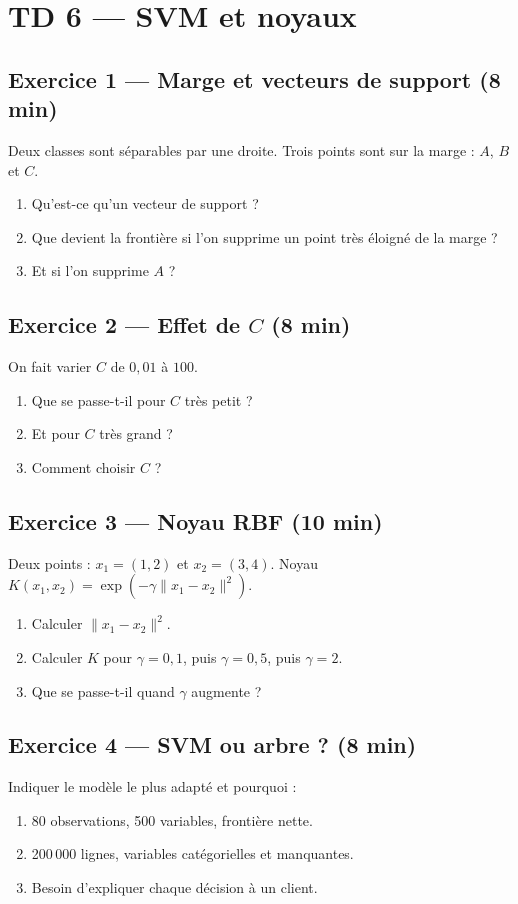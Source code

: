 \section*{TD 6 --- SVM et noyaux}

\subsection*{Exercice 1 --- Marge et vecteurs de support \hfill \normalfont\footnotesize (8 min)}
Deux classes sont séparables par une droite. Trois points sont sur la marge :
$A$, $B$ et $C$.
\begin{enumerate}
  \item Qu'est-ce qu'un vecteur de support ?
  \item Que devient la frontière si l'on supprime un point très éloigné de la
        marge ?
  \item Et si l'on supprime $A$ ?
\end{enumerate}

\subsection*{Exercice 2 --- Effet de $C$ \hfill \normalfont\footnotesize (8 min)}
On fait varier $C$ de $0{,}01$ à $100$.
\begin{enumerate}
  \item Que se passe-t-il pour $C$ très petit ?
  \item Et pour $C$ très grand ?
  \item Comment choisir $C$ ?
\end{enumerate}

\subsection*{Exercice 3 --- Noyau RBF \hfill \normalfont\footnotesize (10 min)}
Deux points : $x_1=(1,2)$ et $x_2=(3,4)$. Noyau
$K(x_1,x_2)=\exp(-\gamma\lVert x_1-x_2\rVert^2)$.
\begin{enumerate}
  \item Calculer $\lVert x_1-x_2\rVert^2$.
  \item Calculer $K$ pour $\gamma=0{,}1$, puis $\gamma=0{,}5$, puis $\gamma=2$.
  \item Que se passe-t-il quand $\gamma$ augmente ?
\end{enumerate}

\subsection*{Exercice 4 --- SVM ou arbre ? \hfill \normalfont\footnotesize (8 min)}
Indiquer le modèle le plus adapté et pourquoi :
\begin{enumerate}
  \item 80 observations, 500 variables, frontière nette.
  \item 200\,000 lignes, variables catégorielles et manquantes.
  \item Besoin d'expliquer chaque décision à un client.
\end{enumerate}

